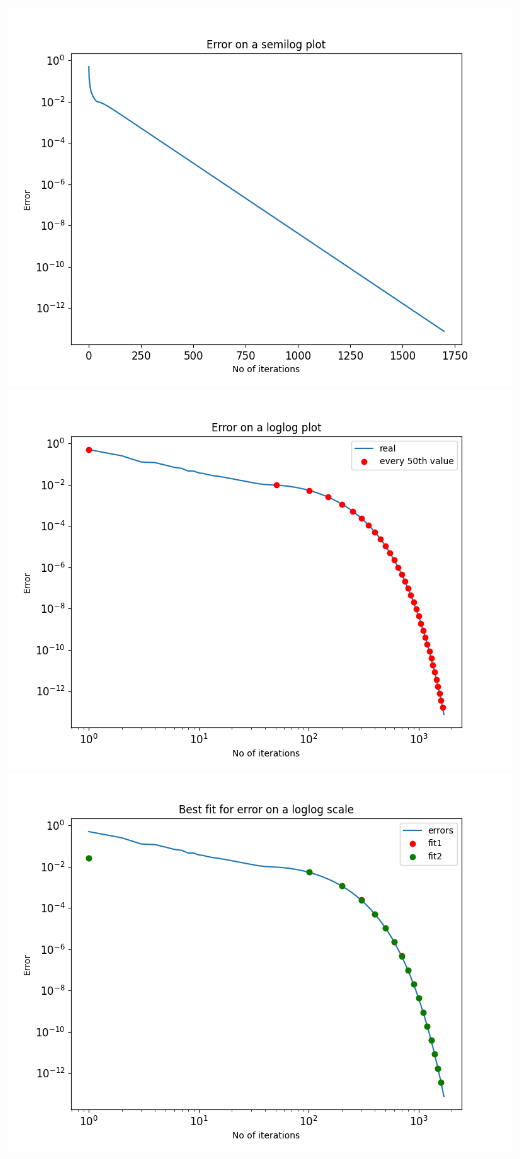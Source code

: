 \documentclass[11pt, a4paper]{article}
\begin{document}
    
     \includegraphics[scale=0.8]{Figure2.png} 
     \includegraphics[scale=0.8]{Figure3.png}  
     \includegraphics[scale=0.8]{Figure4.png}  
\end{document}
